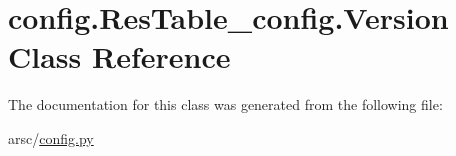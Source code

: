 \hypertarget{classconfig_1_1ResTable__config_1_1Version}{}\section{config.\+Res\+Table\+\_\+config.\+Version Class Reference}
\label{classconfig_1_1ResTable__config_1_1Version}


The documentation for this class was generated from the following file\+:\begin{DoxyCompactItemize}
\item 
arsc/\mbox{\hyperlink{config_8py}{config.\+py}}\end{DoxyCompactItemize}
